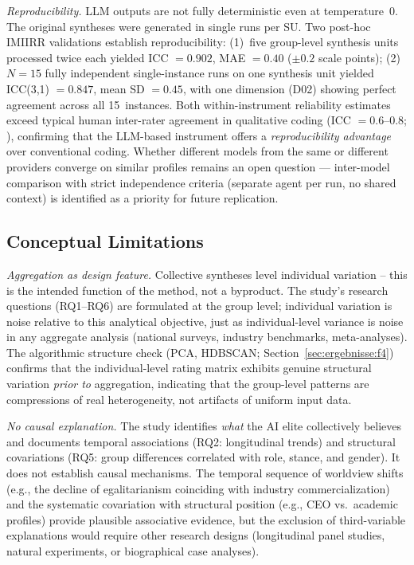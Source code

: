 \documentclass[12pt,a4paper]{article}
\begin{document}
\emph{Reproducibility.} LLM outputs are not fully deterministic even at temperature~0. The original syntheses were generated in single runs per SU. Two post-hoc IMIIRR validations establish reproducibility: (1)~five group-level synthesis units processed twice each yielded ICC $= 0.902$, MAE $= 0.40$ ($\pm 0.2$ scale points); (2)~$N = 15$ fully independent single-instance runs on one synthesis unit yielded ICC(3,1) $= 0.847$, mean SD $= 0.45$, with one dimension (D02) showing perfect agreement across all 15~instances. Both within-instrument reliability estimates exceed typical human inter-rater agreement in qualitative coding (ICC $= 0.6$--$0.8$; \citealt{Hallgren2012}), confirming that the LLM-based instrument offers a \emph{reproducibility advantage} over conventional coding. Whether different models from the same or different providers converge on similar profiles remains an open question --- inter-model comparison with strict independence criteria (separate agent per run, no shared context) is identified as a priority for future replication.


\subsection{Conceptual Limitations}

\emph{Aggregation as design feature.} Collective syntheses level individual variation -- this is the intended function of the method, not a byproduct. The study's research questions (RQ1--RQ6) are formulated at the group level; individual variation is noise relative to this analytical objective, just as individual-level variance is noise in any aggregate analysis (national surveys, industry benchmarks, meta-analyses). The algorithmic structure check (PCA, HDBSCAN; Section~\ref{sec:ergebnisse:f4}) confirms that the individual-level rating matrix exhibits genuine structural variation \emph{prior to} aggregation, indicating that the group-level patterns are compressions of real heterogeneity, not artifacts of uniform input data.

\emph{No causal explanation.} The study identifies \emph{what} the AI elite collectively believes and documents temporal associations (RQ2: longitudinal trends) and structural covariations (RQ5: group differences correlated with role, stance, and gender). It does not establish causal mechanisms. The temporal sequence of worldview shifts (e.g., the decline of egalitarianism coinciding with industry commercialization) and the systematic covariation with structural position (e.g., CEO vs.\ academic profiles) provide plausible associative evidence, but the exclusion of third-variable explanations would require other research designs (longitudinal panel studies, natural experiments, or biographical case analyses).
\end{document}
